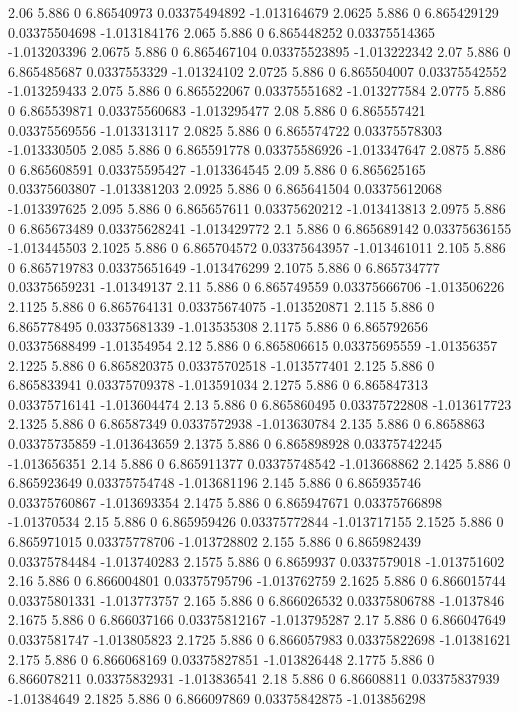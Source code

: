 {2.06 5.886 0 6.86540973 0.03375494892 -1.013164679
2.0625 5.886 0 6.865429129 0.03375504698 -1.013184176
2.065 5.886 0 6.865448252 0.03375514365 -1.013203396
2.0675 5.886 0 6.865467104 0.03375523895 -1.013222342
2.07 5.886 0 6.865485687 0.0337553329 -1.01324102
2.0725 5.886 0 6.865504007 0.03375542552 -1.013259433
2.075 5.886 0 6.865522067 0.03375551682 -1.013277584
2.0775 5.886 0 6.865539871 0.03375560683 -1.013295477
2.08 5.886 0 6.865557421 0.03375569556 -1.013313117
2.0825 5.886 0 6.865574722 0.03375578303 -1.013330505
2.085 5.886 0 6.865591778 0.03375586926 -1.013347647
2.0875 5.886 0 6.865608591 0.03375595427 -1.013364545
2.09 5.886 0 6.865625165 0.03375603807 -1.013381203
2.0925 5.886 0 6.865641504 0.03375612068 -1.013397625
2.095 5.886 0 6.865657611 0.03375620212 -1.013413813
2.0975 5.886 0 6.865673489 0.03375628241 -1.013429772
2.1 5.886 0 6.865689142 0.03375636155 -1.013445503
2.1025 5.886 0 6.865704572 0.03375643957 -1.013461011
2.105 5.886 0 6.865719783 0.03375651649 -1.013476299
2.1075 5.886 0 6.865734777 0.03375659231 -1.01349137
2.11 5.886 0 6.865749559 0.03375666706 -1.013506226
2.1125 5.886 0 6.865764131 0.03375674075 -1.013520871
2.115 5.886 0 6.865778495 0.03375681339 -1.013535308
2.1175 5.886 0 6.865792656 0.03375688499 -1.01354954
2.12 5.886 0 6.865806615 0.03375695559 -1.01356357
2.1225 5.886 0 6.865820375 0.03375702518 -1.013577401
2.125 5.886 0 6.865833941 0.03375709378 -1.013591034
2.1275 5.886 0 6.865847313 0.03375716141 -1.013604474
2.13 5.886 0 6.865860495 0.03375722808 -1.013617723
2.1325 5.886 0 6.86587349 0.0337572938 -1.013630784
2.135 5.886 0 6.8658863 0.03375735859 -1.013643659
2.1375 5.886 0 6.865898928 0.03375742245 -1.013656351
2.14 5.886 0 6.865911377 0.03375748542 -1.013668862
2.1425 5.886 0 6.865923649 0.03375754748 -1.013681196
2.145 5.886 0 6.865935746 0.03375760867 -1.013693354
2.1475 5.886 0 6.865947671 0.03375766898 -1.01370534
2.15 5.886 0 6.865959426 0.03375772844 -1.013717155
2.1525 5.886 0 6.865971015 0.03375778706 -1.013728802
2.155 5.886 0 6.865982439 0.03375784484 -1.013740283
2.1575 5.886 0 6.8659937 0.0337579018 -1.013751602
2.16 5.886 0 6.866004801 0.03375795796 -1.013762759
2.1625 5.886 0 6.866015744 0.03375801331 -1.013773757
2.165 5.886 0 6.866026532 0.03375806788 -1.0137846
2.1675 5.886 0 6.866037166 0.03375812167 -1.013795287
2.17 5.886 0 6.866047649 0.0337581747 -1.013805823
2.1725 5.886 0 6.866057983 0.03375822698 -1.01381621
2.175 5.886 0 6.866068169 0.03375827851 -1.013826448
2.1775 5.886 0 6.866078211 0.03375832931 -1.013836541
2.18 5.886 0 6.86608811 0.03375837939 -1.01384649
2.1825 5.886 0 6.866097869 0.03375842875 -1.013856298
}
